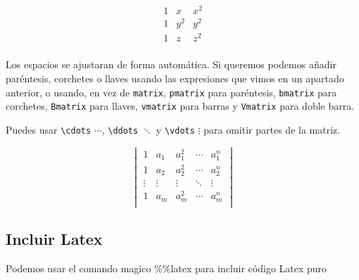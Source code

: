 \documentclass[11pt]{article}
\begin{document}
\[
    \begin{matrix}
    1 & x & x^2 \\
    1 & y^2 & y^2 \\
    1 & z & z^2 \\
    \end{matrix}
\]

Los espacios se ajustaran de forma automática. Si queremos podemos
añadir paréntesis, corchetes o llaves usando las expresiones que vimos
en un apartado anterior, o usando, en vez de \texttt{matrix},
\texttt{pmatrix} para paréntesis, \texttt{bmatrix} para corchetes,
\texttt{Bmatrix} para llaves, \texttt{vmatrix} para barras y
\texttt{Vmatrix} para doble barra.

Puedes usar \texttt{\textbackslash{}cdots} \(\cdots\),
\texttt{\textbackslash{}ddots} \(\ddots\) y
\texttt{\textbackslash{}vdots} \(\vdots\) para omitir partes de la
matriz.

\[
\begin{vmatrix}
1      & a_1    & a_1^2  & \cdots & a_1^n  \\
1      & a_2    & a_2^2  & \cdots & a_2^n  \\
\vdots & \vdots & \vdots & \ddots & \vdots \\
1      & a_m    & a_m^2  & \cdots & a_m^n  \\
\end{vmatrix}
\]

    \subsection{Incluir Latex}\label{incluir-latex}

Podemos usar el comando magico \%\%latex para incluir código Latex puro
\end{document}
